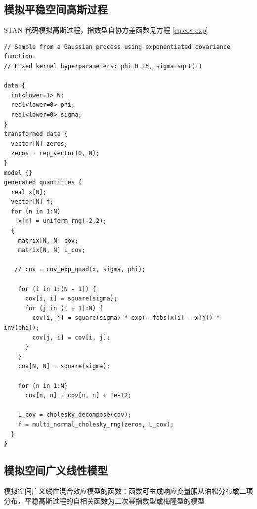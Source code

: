\documentclass[12pt,a4paper,UTF8,twoside]{book}
\theoremstyle{definition}
\theoremstyle{definition}
\theoremstyle{definition}
\theoremstyle{remark}
\begin{document}
\hypertarget{simulate-SGP-code}{%
\subsection*{模拟平稳空间高斯过程}\label{simulate-SGP-code}}

STAN 代码模拟高斯过程，指数型自协方差函数见方程 \ref{eq:cov-exp}

\begin{verbatim}
// Sample from a Gaussian process using exponentiated covariance function.
// Fixed kernel hyperparameters: phi=0.15, sigma=sqrt(1)

data {
  int<lower=1> N;
  real<lower=0> phi;
  real<lower=0> sigma;
}
transformed data {
  vector[N] zeros;
  zeros = rep_vector(0, N);
}
model {}
generated quantities {
  real x[N];
  vector[N] f;
  for (n in 1:N)
    x[n] = uniform_rng(-2,2);
  {
    matrix[N, N] cov;
    matrix[N, N] L_cov;
    
   // cov = cov_exp_quad(x, sigma, phi);

    for (i in 1:(N - 1)) {
      cov[i, i] = square(sigma);
      for (j in (i + 1):N) {
        cov[i, j] = square(sigma) * exp(- fabs(x[i] - x[j]) * inv(phi));
        cov[j, i] = cov[i, j];
      }
    }
    cov[N, N] = square(sigma); 
    
    for (n in 1:N)
      cov[n, n] = cov[n, n] + 1e-12;

    L_cov = cholesky_decompose(cov);
    f = multi_normal_cholesky_rng(zeros, L_cov);
  }
}
\end{verbatim}

\hypertarget{simulate-SGLMM-code}{%
\subsection*{模拟空间广义线性模型}\label{simulate-SGLMM-code}}

模拟空间广义线性混合效应模型的函数：函数可生成响应变量服从泊松分布或二项分布，平稳高斯过程的自相关函数为二次幂指数型或梅隆型的模型
\end{document}
